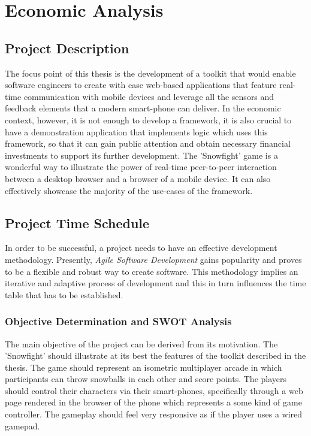 \section{Economic Analysis}

\subsection{Project Description}

The focus point of this thesis is the development of a toolkit that would
enable software engineers to create with ease web-based applications that
feature real-time communication with mobile devices and leverage all the
sensors and feedback elements that a modern smart-phone can deliver. In the
economic context, however, it is not enough to develop a framework, it is also
crucial to have a demonstration application that implements logic which uses
this framework, so that it can gain public attention and obtain necessary
financial investments to support its further development. The 'Snowfight' game
is a wonderful way to illustrate the power of real-time peer-to-peer
interaction between a desktop browser and a browser of a mobile device. It can
also effectively showcase the majority of the use-cases of the framework.

\subsection{Project Time Schedule}

In order to be successful, a project needs to have an effective development
methodology. Presently, \emph{Agile Software Development} gains popularity and
proves to be a flexible and robust way to create software. This methodology
implies an iterative and adaptive process of development and this in turn
influences the time table that has to be established.

\subsubsection{Objective Determination and SWOT Analysis}

The main objective of the project can be derived from its motivation. The
'Snowfight' should illustrate at its best the features of the toolkit
described in the thesis. The game should represent an isometric multiplayer
arcade in which participants can throw snowballs in each other and score
points. The players should control their characters via their smart-phones,
specifically through a web page rendered in the browser of the phone which
represents a some kind of game controller. The gameplay should feel very
responsive as if the player uses a wired gamepad.

